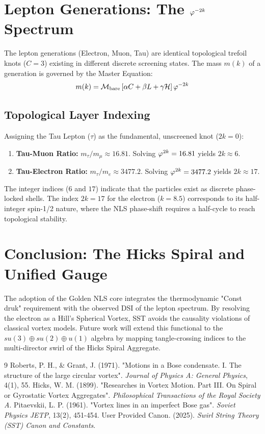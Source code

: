 \documentclass[11pt]{article}
\begin{document}
\section{Lepton Generations: The $\varphi^{-2k}$ Spectrum}
The lepton generations (Electron, Muon, Tau) are identical topological trefoil knots ($C=3$) existing in different discrete screening states. The mass $m(k)$ of a generation is governed by the Master Equation:
\begin{equation}
    m(k) = \mathcal{M}_{\text{bare}} \left[ \alpha C + \beta L + \gamma \mathcal{H} \right] \varphi^{-2k}
\end{equation}

\subsection{Topological Layer Indexing}
Assigning the Tau Lepton ($\tau$) as the fundamental, unscreened knot ($2k=0$):
\begin{enumerate}
    \item \textbf{Tau-Muon Ratio:} $m_\tau/m_\mu \approx 16.81$. Solving $\varphi^{2k} = 16.81$ yields $2k \approx 6$.
    \item \textbf{Tau-Electron Ratio:} $m_\tau/m_e \approx 3477.2$. Solving $\varphi^{2k} = 3477.2$ yields $2k \approx 17$.
\end{enumerate}
The integer indices ($6$ and $17$) indicate that the particles exist as discrete phase-locked shells. The index $2k=17$ for the electron ($k=8.5$) corresponds to its half-integer spin-1/2 nature, where the NLS phase-shift requires a half-cycle to reach topological stability.



\section{Conclusion: The Hicks Spiral and Unified Gauge}
The adoption of the Golden NLS core integrates the thermodynamic "Const druk" requirement with the observed DSI of the lepton spectrum. By resolving the electron as a Hill's Spherical Vortex, SST avoids the causality violations of classical vortex models. Future work will extend this functional to the $su(3) \oplus su(2) \oplus u(1)$ algebra by mapping tangle-crossing indices to the multi-director swirl of the Hicks Spiral Aggregate.

\begin{thebibliography}{9}
 Roberts, P. H., \& Grant, J. (1971). "Motions in a Bose condensate. I. The structure of the large circular vortex". \textit{Journal of Physics A: General Physics}, 4(1), 55.
 Hicks, W. M. (1899). "Researches in Vortex Motion. Part III. On Spiral or Gyrostatic Vortex Aggregates". \textit{Philosophical Transactions of the Royal Society A}.
 Pitaevskii, L. P. (1961). "Vortex lines in an imperfect Bose gas". \textit{Soviet Physics JETP}, 13(2), 451-454.
 User Provided Canon. (2025). \textit{Swirl String Theory (SST) Canon and Constants}.
\end{thebibliography}
\end{document}
